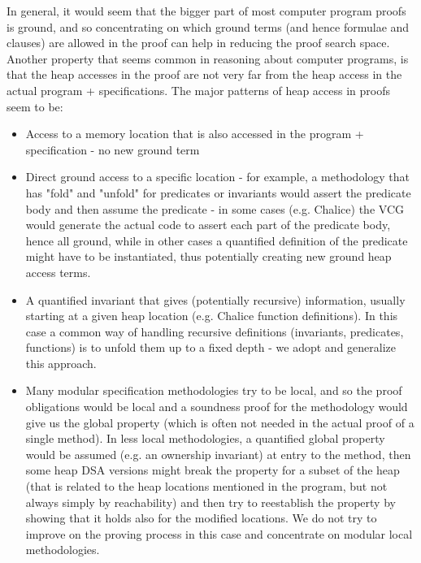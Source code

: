 		In general, it would seem that the bigger part of most computer program proofs is ground, and so concentrating on which ground terms (and hence formulae and clauses) are allowed in the proof can help in reducing the proof search space.
		Another property that seems common in reasoning about computer programs, is that the heap accesses in the proof are not very far from the heap access in the actual program + specifications.
		The major patterns of heap access in proofs seem to be:
		\begin{itemize}
			\item Access to a memory location that is also accessed in the program + specification - no new ground term
			\item Direct ground access to a specific location - for example, a methodology that has "fold" and "unfold" for predicates or invariants would assert the predicate body and then assume the predicate - in some cases (e.g. Chalice) the VCG would generate the actual code to assert each part of the predicate body, hence all ground, while in other cases a quantified definition of the predicate might have to be instantiated, thus potentially creating new ground heap access terms.
			\item A quantified invariant that gives (potentially recursive) information, usually starting at a given heap location (e.g. Chalice function definitions).
			In this case a common way of handling recursive definitions (invariants, predicates, functions) is to unfold them up to a fixed depth - we adopt and generalize this approach.
			\item Many modular specification methodologies try to be local, and so the proof obligations would be local and a soundness proof for the methodology would give us the global property (which is often not needed in the actual proof of a single method).
			In less local methodologies, a quantified global property would be assumed (e.g. an ownership invariant) at entry to the method, then some heap DSA versions might break the property for a subset of the heap (that is related to the heap locations mentioned in the program, but not always simply by reachability) and then try to reestablish the property by showing that it holds also for the modified locations.
			We do not try to improve on the proving process in this case and concentrate on modular local methodologies.
		\end{itemize}
		
